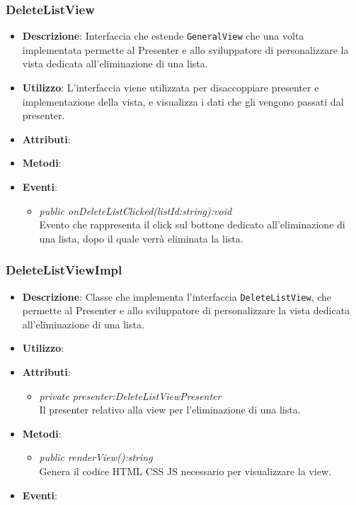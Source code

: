 \subsubsection{DeleteListView}
\begin{itemize}
\item \textbf{Descrizione}: Interfaccia che estende \texttt{GeneralView} che una volta implementata permette al Presenter e allo sviluppatore di personalizzare la vista dedicata all'eliminazione di una lista.
\item \textbf{Utilizzo}: L'interfaccia viene utilizzata per disaccoppiare presenter e implementazione della vista, e visualizza i dati che gli vengono passati dal presenter.
\item \textbf{Attributi}: 
\item \textbf{Metodi}:
\item \textbf{Eventi}:
	\begin{itemize}
	\item \textit{public onDeleteListClicked(listId:string):void}\\
	Evento che rappresenta il click sul bottone dedicato all'eliminazione di una lista, dopo il quale verrà eliminata la lista.
	\end{itemize}
\end{itemize}

\subsubsection{DeleteListViewImpl}
\begin{itemize}
\item \textbf{Descrizione}: Classe che implementa l'interfaccia \texttt{DeleteListView}, che permette al Presenter e allo sviluppatore di personalizzare la vista dedicata all'eliminazione di una lista.
\item \textbf{Utilizzo}:
\item \textbf{Attributi}: 
	\begin{itemize}
	\item \textit{private presenter:DeleteListViewPresenter}\\
		Il presenter relativo alla view per l'eliminazione di una lista.
	\end{itemize}
\item \textbf{Metodi}:
	\begin{itemize}
	\item \textit{public renderView():string}\\
			Genera il codice HTML CSS JS necessario per visualizzare la view.
	\end{itemize}
\item \textbf{Eventi}:
\end{itemize}

